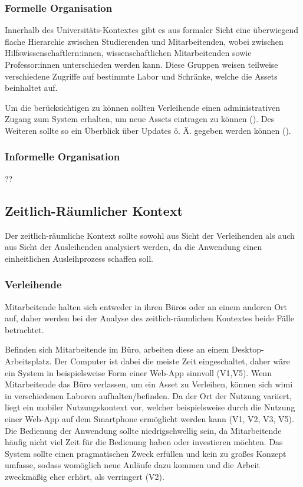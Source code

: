 \subsubsection{Formelle Organisation}
Innerhalb des Universitäts-Kontextes gibt es aus formaler Sicht eine überwiegend flache Hierarchie
zwischen Studierenden und Mitarbeitenden, wobei zwischen Hilfswissenschaftlern:innen,
wissenschaftlichen Mitarbeitenden sowie Professor:innen unterschieden werden kann. Diese Gruppen
weisen teilweise verschiedene Zugriffe auf bestimmte Labor und Schränke, welche die Assets
beinhaltet auf.

Um die  berücksichtigen zu können sollten Verleihende einen administrativen
Zugang zum System erhalten, um neue Assets eintragen zu können (). Des Weiteren sollte so
ein Überblick über Updates ö. Ä. gegeben werden können (). 

\subsubsection{Informelle Organisation}
??
\subsection{Zeitlich-Räumlicher Kontext}
\label{section:zeit}
Der zeitlich-räumliche Kontext sollte sowohl aus Sicht der Verleihenden als auch aus Sicht der
Ausleihenden analysiert werden, da die Anwendung einen einheitlichen Ausleihprozess schaffen soll. 

\subsubsection{Verleihende}
Mitarbeitende halten sich entweder in ihren Büros oder an einem anderen Ort auf, daher werden bei
der Analyse des zeitlich-räumlichen Kontextes beide Fälle betrachtet.

Befinden sich Mitarbeitende im Büro, arbeiten diese an einem Desktop-Arbeitsplatz. Der Computer ist
dabei die meiste Zeit eingeschaltet, daher wäre ein System in beispielsweise Form einer Web-App
sinnvoll (V1,V5). Wenn Mitarbeitende das Büro verlassen, um ein Asset zu Verleihen, können sich
\ac{wimi} in verschiedenen Laboren aufhalten/befinden. Da der Ort der Nutzung variiert, liegt ein
mobiler Nutzungskontext vor, welcher beispielsweise durch die Nutzung einer Web-App auf dem
Smartphone ermöglicht werden kann (V1, V2, V3, V5). Die Bedienung der Anwendung sollte
niedrigschwellig sein, da Mitarbeitende häufig nicht viel Zeit für die Bedienung haben oder
investieren möchten. Das System sollte einen pragmatischen Zweck erfüllen und kein zu großes Konzept
umfasse, sodass womöglich neue Anläufe dazu kommen und die Arbeit zweckmäßig eher erhört, als
verringert (V2).

